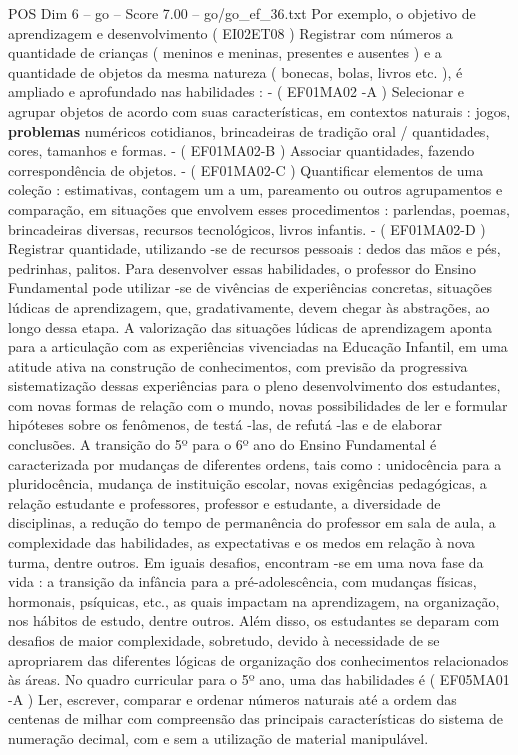 \begin{textsample}{POS Dim 6 – go – Score 7.00 – go/go\_ef\_36.txt}
Por exemplo, o objetivo de aprendizagem e desenvolvimento ( EI02ET08 ) Registrar com números a quantidade de crianças ( meninos e meninas, presentes e ausentes ) e a quantidade de objetos da mesma natureza ( bonecas, bolas, livros etc. ), é ampliado e aprofundado nas habilidades : - ( EF01MA02 -A ) Selecionar e agrupar objetos de acordo com suas características, em contextos naturais : jogos, \textbf{problemas} numéricos cotidianos, brincadeiras de tradição oral / quantidades, cores, tamanhos e formas. - ( EF01MA02-B ) Associar quantidades, fazendo correspondência de objetos. - ( EF01MA02-C ) Quantificar elementos de uma coleção : estimativas, contagem um a um, pareamento ou outros agrupamentos e comparação, em situações que envolvem esses procedimentos : parlendas, poemas, brincadeiras diversas, recursos tecnológicos, livros infantis. - ( EF01MA02-D ) Registrar quantidade, utilizando -se de recursos pessoais : dedos das mãos e pés, pedrinhas, palitos.
Para desenvolver essas habilidades, o professor do Ensino Fundamental pode utilizar -se de vivências de experiências concretas, situações lúdicas de aprendizagem, que, gradativamente, devem chegar às abstrações, ao longo dessa etapa.
A valorização das situações lúdicas de aprendizagem aponta para a articulação com as experiências vivenciadas na Educação Infantil, em uma atitude ativa na construção de conhecimentos, com previsão da progressiva sistematização dessas experiências para o pleno desenvolvimento dos estudantes, com novas formas de relação com o mundo, novas possibilidades de ler e formular hipóteses sobre os fenômenos, de testá -las, de refutá -las e de elaborar conclusões.
A transição do 5º para o 6º ano do Ensino Fundamental é caracterizada por mudanças de diferentes ordens, tais como : unidocência para a pluridocência, mudança de instituição escolar, novas exigências pedagógicas, a relação estudante e professores, professor e estudante, a diversidade de disciplinas, a redução do tempo de permanência do professor em sala de aula, a complexidade das habilidades, as expectativas e os medos em relação à nova turma, dentre outros.
Em iguais desafios, encontram -se em uma nova fase da vida : a transição da infância para a pré-adolescência, com mudanças físicas, hormonais, psíquicas, etc., as quais impactam na aprendizagem, na organização, nos hábitos de estudo, dentre outros.
Além disso, os estudantes se deparam com desafios de maior complexidade, sobretudo, devido à necessidade de se apropriarem das diferentes lógicas de organização dos conhecimentos relacionados às áreas.
No quadro curricular para o 5º ano, uma das habilidades é ( EF05MA01 -A ) Ler, escrever, comparar e ordenar números naturais até a ordem das centenas de milhar com compreensão das principais características do sistema de numeração decimal, com e sem a utilização de material manipulável.

\end{textsample}
